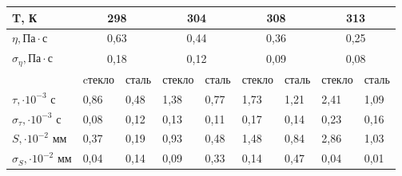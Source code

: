 \documentclass[a4paper,12pt]{article} %
\begin{document}
\begin{table}[h!]
\begin{tabular}{|l|ll|ll|ll|ll|}
\hline
T, К                                    & \multicolumn{2}{c|}{298}            & \multicolumn{2}{c|}{304}            & \multicolumn{2}{c|}{308}            & \multicolumn{2}{c|}{313}            \\ \hline
$\eta, \text{Па} \cdot \text{с}$        & \multicolumn{2}{c|}{0,63}           & \multicolumn{2}{c|}{0,44}           & \multicolumn{2}{c|}{0,36}           & \multicolumn{2}{c|}{0,25}           \\ \hline
$\sigma_\eta, \text{Па} \cdot \text{с}$ & \multicolumn{2}{c|}{0,18}           & \multicolumn{2}{c|}{0,12}           & \multicolumn{2}{c|}{0,09}           & \multicolumn{2}{c|}{0,08}           \\ \hline
                                        & \multicolumn{1}{l|}{cтекло} & сталь & \multicolumn{1}{l|}{стекло} & сталь & \multicolumn{1}{l|}{стекло} & сталь & \multicolumn{1}{l|}{стекло} & сталь \\ \hline
$\tau, \cdot 10^{-3}\text{ с}$          & \multicolumn{1}{l|}{0,86}   & 0,48  & \multicolumn{1}{l|}{1,38}   & 0,77  & \multicolumn{1}{l|}{1,73}   & 1,21  & \multicolumn{1}{l|}{2,41}   & 1,09  \\ \hline
$\sigma_\tau, \cdot 10^{-3}\text{ с}$   & \multicolumn{1}{l|}{0,08}   & 0,12  & \multicolumn{1}{l|}{0,13}   & 0,11  & \multicolumn{1}{l|}{0,17}   & 0,14  & \multicolumn{1}{l|}{0,23}   & 0,16  \\ \hline
$S, \cdot 10^{-2}\text{ мм}$            & \multicolumn{1}{l|}{0,37}   & 0,19  & \multicolumn{1}{l|}{0,93}   & 0,48  & \multicolumn{1}{l|}{1,48}   & 0,84  & \multicolumn{1}{l|}{2,86}   & 1,03  \\ \hline
$\sigma_S, \cdot 10^{-2}\text{ мм}$     & \multicolumn{1}{l|}{0,04}   & 0,14  & \multicolumn{1}{l|}{0,09}   & 0,33  & \multicolumn{1}{l|}{0,14}   & 0,47  & \multicolumn{1}{l|}{0,04}   & 0,01  \\ \hline
\end{tabular}
\end{table}

\newpage
\end{document}
